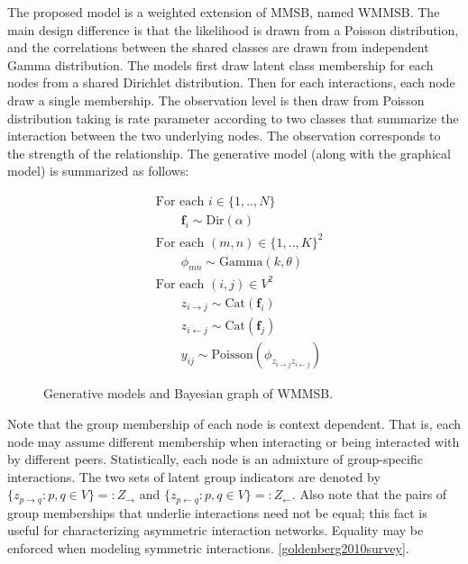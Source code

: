 The proposed model is a weighted extension of MMSB, named WMMSB. The main design difference is that the likelihood is drawn from a Poisson distribution, and the correlations between the shared classes are drawn from independent Gamma distribution. The models first draw latent class membership for each nodes from a shared Dirichlet distribution. Then for each interactions, each node draw a single membership. The observation level is then draw from Poisson distribution taking is rate parameter according to two classes that summarize the interaction between the two underlying nodes. The observation corresponds to the strength of the relationship. The generative model (along  with the graphical model) is summarized as follows:

\begin{figure}[h]
\begin{minipage}[h]{0.45\linewidth}
\begin{align*}
	&\textrm{For each } i \in \{1, .., N\}  \\
	&\qquad\bm{f}_i \sim \textrm{Dir}(\alpha)\\
	&\textrm{For each }  (m,n) \in \{1,..,K\}^2 \\
	&\qquad\phi_{mn} \sim \mathrm{Gamma}(k,\theta)\\
	&\textrm{For each } (i,j) \in V^2 \\
	&\qquad z_{i \rightarrow j} \sim \mbox{Cat}(\bm{f}_i)\\
	&\qquad z_{i \leftarrow j} \sim \mbox{Cat}(\bm{f}_j)\\
    &\qquad y_{ij} \sim \mathrm{Poisson}(\phi_{z_{i \rightarrow j}z_{i \leftarrow j}})
\end{align*}
\end{minipage}
\begin{minipage}[h]{0.45\linewidth}
	\scalebox{0.88}{}
\end{minipage}
    \caption{Generative models and Bayesian graph of WMMSB.}
\end{figure}

Note that the group membership of each node is context dependent. That is, each node may assume different membership when interacting or being interacted with by different peers. Statistically, each node is an admixture of group-specific interactions. The two sets of latent group indicators are denoted by $\{z_{p\rightarrow q} : p, q \in V\}  =: Z_\rightarrow$ and $\{z_{p\leftarrow q} : p, q \in V\}  =: Z_\leftarrow$. Also note that the pairs of group memberships that underlie interactions need not be equal; this fact is useful for characterizing asymmetric interaction networks. Equality may be enforced when modeling symmetric interactions. \ref{goldenberg2010survey}.

